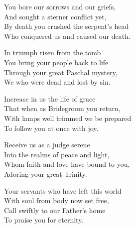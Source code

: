 You bore our sorrows and our griefs,\\
And sought a sterner conflict yet,\\
By death you crushed the serpent's head\\
Who conquered us and caused our death.

In triumph risen from the tomb\\
You bring your people back to life\\
Through your great Paschal mystery,\\
We who were dead and lost by sin.

Increase in us the life of grace\\
That when as Bridegroom you return,\\
With lamps well trimmed we be prepared\\
To follow you at once with joy.

Receive us as a judge serene\\
Into the realms of peace and light,\\
Whom faith and love have bound to you,\\
Adoring your great Trinity.

Your servants who have left this world\\
With soul from body now set free,\\
Call swiftly to our Father's home\\
To praise you for eternity.
